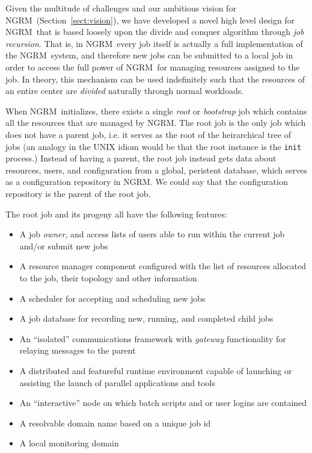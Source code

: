 \documentclass{article}
\newcommand{\ngrm}{NGRM}
\begin{document}
Given the multitude of challenges and our ambitious vision for
\ngrm\ (Section~\ref{sect:vision}), we have developed a novel
high level design for \ngrm\ that is based loosely upon the
divide and conquer algorithm through {\em job recursion}. That
is, in \ngrm\ every job itself is actually a full implementation
of the \ngrm\ system, and therefore new jobs can be submitted to a
local job in order to access the full power of \ngrm\ for managing
resources assigned to the job. In theory, this mechanism can be
used indefinitely such that the resources of an entire center
are {\em divided} naturally through normal workloads.  

When \ngrm\ initializes, there exists a single {\em root} or {\em
bootstrap} job which contains all the resources that are managed
by \ngrm. The root job is the only job which does not have a
parent job, i.e. it serves as the root of the heirarchical tree of
jobs (an analogy in the UNIX idiom would be that the root instance
is the {\tt init} process.) Instead of having a parent, the root
job instead gets data about resources, users, and configuration
from a global, peristent database, which serves as a configuration
repository in \ngrm. We could say that the configuration repository
is the parent of the root job.

The root job and its progeny all have the following features:

\begin{itemize}
\item{A job {\em owner}, and access lists of users able to run
      within the  current job and/or submit new jobs}
\item{A resource manager component configured with the list of
      resources allocated to the job, their topology and other information}
\item{A scheduler for accepting and scheduling new jobs}
\item{A job database for recording new, running, and completed child jobs}
\item{An ``isolated'' communications framework with {\em gateway} functionality
      for relaying messages to the parent}
\item{A distributed and featureful runtime environment capable of launching
      or assisting the launch of parallel applications and tools}
\item{An ``interactive'' node on which batch scripts and or user logins
       are contained}
\item{A resolvable domain name based on a unique job id}
\item{A local monitoring domain}
\end{itemize}
\end{document}
